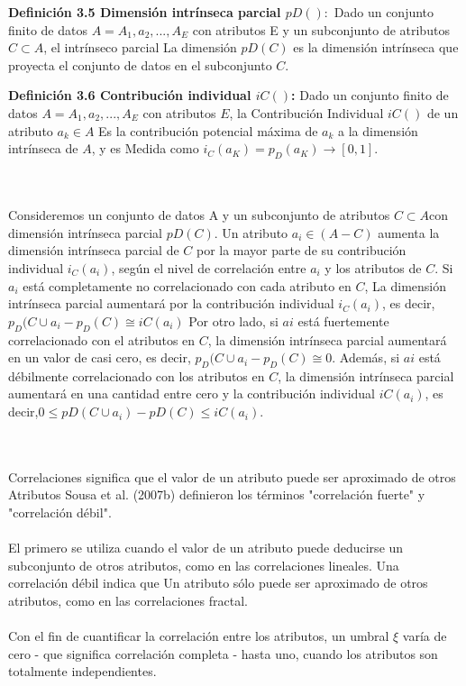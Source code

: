 \textbf{Definición 3.5 Dimensión intrínseca parcial $pD():$} Dado un conjunto finito de datos $A = {A_1, a_2,. . . , A_E}$ con atributos E y un subconjunto de atributos $C \subset A$, el intrínseco parcial
La dimensión $pD (C)$ es la dimensión intrínseca que proyecta el conjunto de datos en el subconjunto $C$.


\textbf{Definición 3.6 Contribución individual $iC()$: }Dado un conjunto finito de datos $A = {A_1, a_2,. . . , A_E}$ con atributos $E$, la Contribución Individual $iC()$ de un atributo $a_k \in A $
Es la contribución potencial máxima de $a_k$ a la dimensión intrínseca de $A$, y es
Medida como $ i_C(a_K) = p_D({a_K})\rightarrow [0,1]$.

\\\\
Consideremos un conjunto de datos A y un subconjunto de atributos  $C \subset A$con dimensión intrínseca parcial
$pD (C)$. Un atributo $a_i \in (A - C)$ aumenta la dimensión intrínseca parcial de $ C$ por la mayor parte de su contribución individual $i_C (a_i)$, según el nivel de correlación entre $a_i$ y los atributos de $C$. Si $a_i$ está completamente no correlacionado con cada atributo en $C$,
La dimensión intrínseca parcial aumentará por la contribución individual  $i_C (a_i)$, es decir, $p_D(C \cup{a_i} - p_D(C)\cong iC (a_i)$ Por otro lado, si $ai$ está fuertemente correlacionado con el atributos en $C$, la dimensión intrínseca parcial aumentará en un valor de casi cero, es decir, $p_D(C \cup{a_i} - p_D(C)\cong 0$. Además, si $ai$ está débilmente correlacionado con los atributos en $C$, la dimensión intrínseca parcial aumentará en una cantidad entre cero y la contribución individual $iC (a_i)$, es decir,$0\leq pD(C\cup{a_i}) -pD(C) \leq iC(a_i)$.

\\\\
Correlaciones significa que el valor de un atributo puede ser aproximado de otros
Atributos Sousa et al. (2007b) definieron los términos "correlación fuerte" y "correlación débil".
\\\\
El primero se utiliza cuando el valor de un atributo puede deducirse un subconjunto de otros atributos, como en las correlaciones lineales. Una correlación débil indica que
Un atributo sólo puede ser aproximado de otros atributos, como en las correlaciones fractal.
\\\\

Con el fin de cuantificar la correlación entre los atributos, un umbral $\xi$ varía de cero - que significa correlación completa - hasta uno, cuando los atributos son totalmente independientes.


